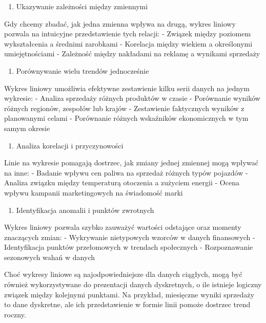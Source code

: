 \documentclass[
  polish,
  letterpaper,
  DIV=11,
  numbers=noendperiod]{scrreprt}
\providecommand{\tightlist}{%
  \setlength{\itemsep}{0pt}\setlength{\parskip}{0pt}}
\begin{document}
\begin{enumerate}
\def\labelenumi{\arabic{enumi}.}
\setcounter{enumi}{1}
\tightlist
\item
  Ukazywanie zależności między zmiennymi
\end{enumerate}

Gdy chcemy zbadać, jak jedna zmienna wpływa na drugą, wykres liniowy
pozwala na intuicyjne przedstawienie tych relacji: - Związek między
poziomem wykształcenia a średnimi zarobkami - Korelacja między wiekiem a
określonymi umiejętnościami - Zależność między nakładami na reklamę a
wynikami sprzedaży

\begin{enumerate}
\def\labelenumi{\arabic{enumi}.}
\setcounter{enumi}{2}
\tightlist
\item
  Porównywanie wielu trendów jednocześnie
\end{enumerate}

Wykres liniowy umożliwia efektywne zestawienie kilku serii danych na
jednym wykresie: - Analiza sprzedaży różnych produktów w czasie -
Porównanie wyników różnych regionów, zespołów lub krajów - Zestawienie
faktycznych wyników z planowanymi celami - Porównanie różnych wskaźników
ekonomicznych w tym samym okresie

\begin{enumerate}
\def\labelenumi{\arabic{enumi}.}
\setcounter{enumi}{3}
\tightlist
\item
  Analiza korelacji i przyczynowości
\end{enumerate}

Linie na wykresie pomagają dostrzec, jak zmiany jednej zmiennej mogą
wpływać na inne: - Badanie wpływu cen paliwa na sprzedaż różnych typów
pojazdów - Analiza związku między temperaturą otoczenia a zużyciem
energii - Ocena wpływu kampanii marketingowych na świadomość marki

\begin{enumerate}
\def\labelenumi{\arabic{enumi}.}
\setcounter{enumi}{4}
\tightlist
\item
  Identyfikacja anomalii i punktów zwrotnych
\end{enumerate}

Wykres liniowy pozwala szybko zauważyć wartości odstające oraz momenty
znaczących zmian: - Wykrywanie nietypowych wzorców w danych finansowych
- Identyfikacja punktów przełomowych w trendach społecznych -
Rozpoznawanie sezonowych wahań w danych

Choć wykresy liniowe są najodpowiedniejsze dla danych ciągłych, mogą być
również wykorzystywane do prezentacji danych dyskretnych, o ile istnieje
logiczny związek między kolejnymi punktami. Na przykład, miesięczne
wyniki sprzedaży to dane dyskretne, ale ich przedstawienie w formie
linii pomoże dostrzec trend roczny.
\end{document}
